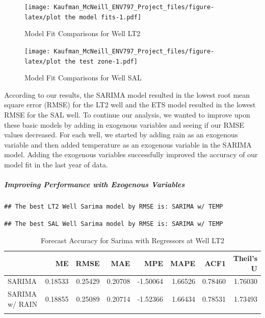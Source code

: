 \documentclass[
]{article}
\begin{document}
\begin{figure}
\centering
\texttt{[image: Kaufman\_McNeill\_ENV797\_Project\_files/figure-latex/plot the model fits-1.pdf]}
\caption{Model Fit Comparisons for Well LT2}
\end{figure}

\begin{figure}
\centering
\texttt{[image: Kaufman\_McNeill\_ENV797\_Project\_files/figure-latex/plot the test zone-1.pdf]}
\caption{Model Fit Comparisons for Well SAL}
\end{figure}

According to our results, the SARIMA model resulted in the lowest root
mean square error (RMSE) for the LT2 well and the ETS model resulted in
the lowest RMSE for the SAL well. To continue our analysis, we wanted to
improve upon these basic models by adding in exogenous variables and
seeing if our RMSE values decreased. For each well, we started by adding
rain as an exogenous variable and then added temperature as an exogenous
variable in the SARIMA model. Adding the exogenous variables
successfully improved the accuracy of our model fit in the last year of
data.

\hypertarget{improving-performance-with-exogenous-variables}{%
\subparagraph{Improving Performance with Exogenous
Variables}\label{improving-performance-with-exogenous-variables}}

\begin{verbatim}
## The best LT2 Well Sarima model by RMSE is: SARIMA w/ TEMP
\end{verbatim}

\begin{verbatim}
## The best SAL Well Sarima model by RMSE is: SARIMA w/ TEMP
\end{verbatim}

\begin{table}
\centering\centering
\caption{\label{tab:compare accuracy for all SARIMAs}Forecast Accuracy for Sarima with Regressors at Well LT2}
\centering
\begin{tabular}[t]{l|r|r|r|r|r|r|r}
\hline
  & ME & RMSE & MAE & MPE & MAPE & ACF1 & Theil's U\\
\hline
SARIMA & 0.18533 & 0.25429 & 0.20708 & -1.50064 & 1.66526 & 0.78460 & 1.76030\\
\hline
SARIMA w/ RAIN & 0.18855 & 0.25089 & 0.20714 & -1.52366 & 1.66434 & 0.78531 & 1.73493\\
\hline
\cellcolor{gray!10}{SARIMA w/ TEMP} & \cellcolor{gray!10}{0.17090} & \cellcolor{gray!10}{0.23875} & \cellcolor{gray!10}{0.19216} & \cellcolor{gray!10}{-1.38419} & \cellcolor{gray!10}{1.54510} & \cellcolor{gray!10}{0.78406} & \cellcolor{gray!10}{1.65290}\\
\hline
\end{tabular}
\end{table}
\end{document}
